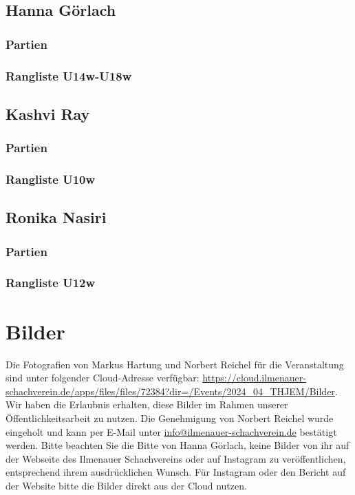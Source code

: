 \documentclass[a4paper,ngerman]{tui-algo-seminar}
\begin{document}
\subsection{Hanna Görlach}
    \subsubsection{Partien}
        
    \subsubsection{Rangliste U14w-U18w}
        
\clearpage

\subsection{Kashvi Ray}
    \subsubsection{Partien}
        
    \subsubsection{Rangliste U10w}
        
\clearpage

\subsection{Ronika Nasiri}
    \subsubsection{Partien}
        
    \subsubsection{Rangliste U12w}
        
    
\clearpage


\section{Bilder}
Die Fotografien von Markus Hartung und Norbert Reichel für die Veranstaltung sind unter folgender Cloud-Adresse verfügbar: \url{https://cloud.ilmenauer-schachverein.de/apps/files/files/72384?dir=/Events/2024_04_THJEM/Bilder}. Wir haben die Erlaubnis erhalten, diese Bilder im Rahmen unserer Öffentlichkeitsarbeit zu nutzen. Die Genehmigung von Norbert Reichel wurde eingeholt und kann per E-Mail unter \href{mailto:info@ilmenauer-schachverein.de}{info@ilmenauer-schachverein.de} bestätigt werden.
Bitte beachten Sie die Bitte von Hanna Görlach, keine Bilder von ihr auf der Webseite des Ilmenauer Schachvereins oder auf Instagram zu veröffentlichen, entsprechend ihrem ausdrücklichen Wunsch. Für Instagram oder den Bericht auf der Website bitte die Bilder direkt aus der Cloud nutzen.

\end{document}
